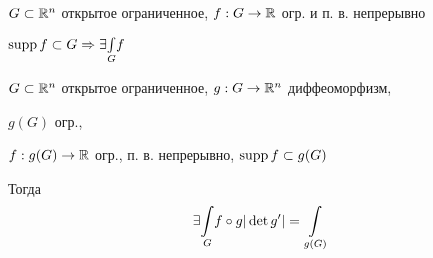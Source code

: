 



    \null\hfill {}

    $G \subset \mathbb{R}^n$ открытое ограниченное, $f : G \rightarrow \mathbb{R}$ огр. и п. в. непрерывно
    \par $\operatorname{supp} f \subset G \Rightarrow \exists \underset{G}{\int} f$

    \begin{theorem}
        $G \subset \mathbb{R}^n$ открытое ограниченное, $g : G \rightarrow \mathbb{R}^n$ диффеоморфизм,
        \par \quad $g(G)$ огр.,
        \par \quad $f : g(G) \rightarrow \mathbb{R}$ огр., п. в. непрерывно, $\operatorname{supp} f \subset g(G)$
        \par Тогда
        \[
            \exists \rhimani{G} f \circ g |\det g'| = \rhimani{g(G)} %
        \]
    \end{theorem}

